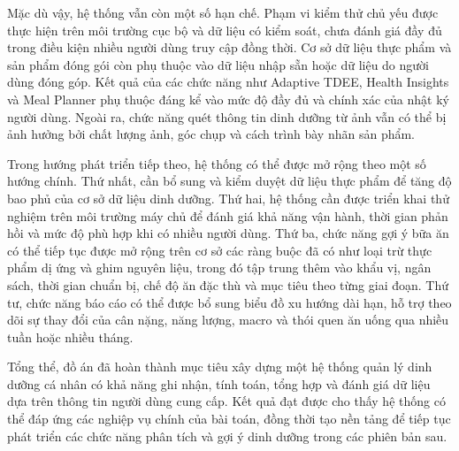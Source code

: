 \documentclass[12pt, a4paper]{report}
\begin{document}
Mặc dù vậy, hệ thống vẫn còn một số hạn chế. Phạm vi kiểm thử chủ yếu được thực hiện trên môi trường cục bộ và dữ liệu có kiểm soát, chưa đánh giá đầy đủ trong điều kiện nhiều người dùng truy cập đồng thời. Cơ sở dữ liệu thực phẩm và sản phẩm đóng gói còn phụ thuộc vào dữ liệu nhập sẵn hoặc dữ liệu do người dùng đóng góp. Kết quả của các chức năng như Adaptive TDEE, Health Insights và Meal Planner phụ thuộc đáng kể vào mức độ đầy đủ và chính xác của nhật ký người dùng. Ngoài ra, chức năng quét thông tin dinh dưỡng từ ảnh vẫn có thể bị ảnh hưởng bởi chất lượng ảnh, góc chụp và cách trình bày nhãn sản phẩm.

Trong hướng phát triển tiếp theo, hệ thống có thể được mở rộng theo một số hướng chính. Thứ nhất, cần bổ sung và kiểm duyệt dữ liệu thực phẩm để tăng độ bao phủ của cơ sở dữ liệu dinh dưỡng. Thứ hai, hệ thống cần được triển khai thử nghiệm trên môi trường máy chủ để đánh giá khả năng vận hành, thời gian phản hồi và mức độ phù hợp khi có nhiều người dùng. Thứ ba, chức năng gợi ý bữa ăn có thể tiếp tục được mở rộng trên cơ sở các ràng buộc đã có như loại trừ thực phẩm dị ứng và ghim nguyên liệu, trong đó tập trung thêm vào khẩu vị, ngân sách, thời gian chuẩn bị, chế độ ăn đặc thù và mục tiêu theo từng giai đoạn. Thứ tư, chức năng báo cáo có thể được bổ sung biểu đồ xu hướng dài hạn, hỗ trợ theo dõi sự thay đổi của cân nặng, năng lượng, macro và thói quen ăn uống qua nhiều tuần hoặc nhiều tháng.

Tổng thể, đồ án đã hoàn thành mục tiêu xây dựng một hệ thống quản lý dinh dưỡng cá nhân có khả năng ghi nhận, tính toán, tổng hợp và đánh giá dữ liệu dựa trên thông tin người dùng cung cấp. Kết quả đạt được cho thấy hệ thống có thể đáp ứng các nghiệp vụ chính của bài toán, đồng thời tạo nền tảng để tiếp tục phát triển các chức năng phân tích và gợi ý dinh dưỡng trong các phiên bản sau.

\clearpage
\pagestyle{empty}
\renewcommand{\bibname}{\centering TÀI LIỆU THAM KHẢO}
\end{document}
